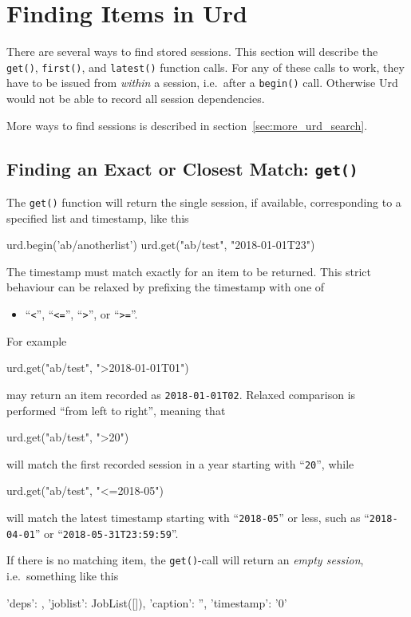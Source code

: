 \section{Finding Items in Urd}

There are several ways to find stored sessions.  This section will
describe the \texttt{get()}, \texttt{first()}, and \texttt{latest()}
function calls.  For any of these calls to work, they have to be
issued from \textsl{within} a session, i.e.\ after a \texttt{begin()}
call.  Otherwise Urd would not be able to record all session
dependencies.

More ways to find sessions is described in section~\ref{sec:more_urd_search}.



\subsection{Finding an Exact or Closest Match:  \texttt{get()}}
\label{sec:urd_get}

The \texttt{get()} function will return the single session, if
available, corresponding to a specified list and timestamp, like this
\begin{python}
urd.begin('ab/anotherlist')
urd.get("ab/test", "2018-01-01T23")
\end{python}
The timestamp must match exactly for an item to be returned.  This
strict behaviour can be relaxed by prefixing the timestamp with one of
\begin{itemize}
\item[] ``\texttt{<}'', ``\texttt{<=}'', ``\texttt{>}'', or ``\texttt{>=}''.
\end{itemize}
For example
\begin{python}
urd.get("ab/test", ">2018-01-01T01")
\end{python}
may return an item recorded as \texttt{2018-01-01T02}.  Relaxed
comparison is performed ``from left to right'', meaning that
\begin{python}
urd.get("ab/test", ">20")
\end{python}
will match the first recorded session in a year starting with
``\texttt{20}'', while
\begin{python}
urd.get("ab/test", "<=2018-05")
\end{python}
will match the latest timestamp starting with ``\texttt{2018-05}'' or less,
such as ``\texttt{2018-04-01}'' or ``\texttt{2018-05-31T23:59:59}''.

If there is no matching item, the \texttt{get()}-call will return
an \textsl{empty session}, i.e.\ something like this
\begin{python}
{'deps': {}, 'joblist': JobList([]), 'caption': '', 'timestamp': '0'}
\end{python}





